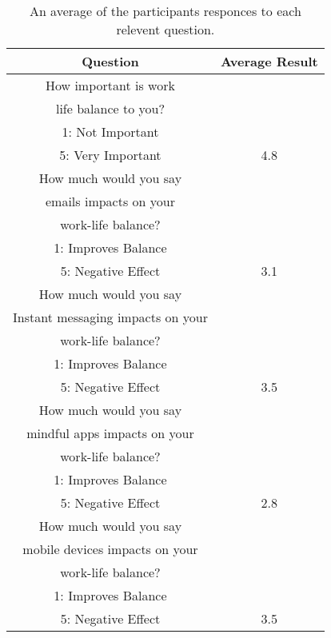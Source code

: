 \documentclass{sigchi}
\begin{document}
	\begin{table}[ht]
		\centering
		\small
		\begin{tabular}[t]{ |c| c | }
			\hline
			Question & Average Result  \\ 
			\hline
			How important is work & \\
			life balance to you? & \\
			1: Not Important & \\
			5: Very Important & 4.8 \\ 
			\hline
			How much would you say & \\
			emails impacts on your & \\
			work-life balance? & \\
			1: Improves Balance & \\
			5: Negative Effect & 3.1  \\ 
			\hline
			How much would you say & \\
			Instant messaging impacts on your & \\
			work-life balance? & \\
			1: Improves Balance & \\
			5: Negative Effect & 3.5 \\
			\hline
			How much would you say & \\
			mindful apps impacts on your & \\
			work-life balance? & \\
			1: Improves Balance & \\
			5: Negative Effect & 2.8 \\
			\hline
			How much would you say & \\
			mobile devices impacts on your & \\
			work-life balance? & \\
			1: Improves Balance & \\
			5: Negative Effect & 3.5 \\
			\hline
		\end{tabular}
		\caption{An average of the participants responces to each relevent question.}
		\label{tab:general_qs}
	\end{table}%
\end{document}
